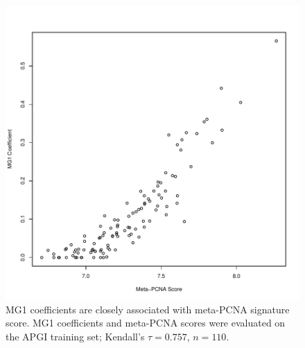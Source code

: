 \documentclass[dissertation.tex]{subfiles}
\begin{document}
\begin{figure}
\centering
\includegraphics[width=.7\linewidth]{analysis/biosurv/reports/18_SIS_diag_dsd_final/figure/metagene-pairs-7}
\caption{MG1 coefficients are closely associated with meta-PCNA signature score.  MG1 coefficients and meta-PCNA scores \cite{Venet2011} were evaluated on the \gls{APGI} training set; Kendall's $\tau = 0.757$, $n = 110$.\label{fig:sigs-nmf-corplots}}
\end{figure}
\end{document}

